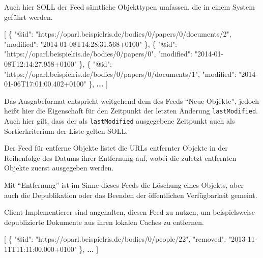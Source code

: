 \documentclass[,a4paper]{article}
\newenvironment{Shaded}{}{}
\newcommand{\DataTypeTok}[1]{\textcolor[rgb]{0.56,0.13,0.00}{{#1}}}
\newcommand{\StringTok}[1]{\textcolor[rgb]{0.25,0.44,0.63}{{#1}}}
\newcommand{\OtherTok}[1]{\textcolor[rgb]{0.00,0.44,0.13}{{#1}}}
\newcommand{\FunctionTok}[1]{\textcolor[rgb]{0.02,0.16,0.49}{{#1}}}
\newcommand{\ErrorTok}[1]{\textcolor[rgb]{1.00,0.00,0.00}{\textbf{{#1}}}}
\begin{document}
Auch hier SOLL der Feed sämtliche Objekttypen umfassen, die in einem
System geführt werden.

\begin{Shaded}
\begin{Highlighting}[]
\OtherTok{[}
    \FunctionTok{\{}
        \DataTypeTok{"@id"}\FunctionTok{:} \StringTok{"https://oparl.beispielris.de/bodies/0/papers/0/documents/2"}\FunctionTok{,}
        \DataTypeTok{"modified"}\FunctionTok{:} \StringTok{"2014-01-08T14:28:31.568+0100"}
    \FunctionTok{\}}\OtherTok{,}
    \FunctionTok{\{}
        \DataTypeTok{"@id"}\FunctionTok{:} \StringTok{"https://oparl.beispielris.de/bodies/0/papers/0"}\FunctionTok{,}
        \DataTypeTok{"modified"}\FunctionTok{:} \StringTok{"2014-01-08T12:14:27.958+0100"}
    \FunctionTok{\}}\OtherTok{,}
    \FunctionTok{\{}
        \DataTypeTok{"@id"}\FunctionTok{:} \StringTok{"https://oparl.beispielris.de/bodies/0/papers/0/documents/1"}\FunctionTok{,}
        \DataTypeTok{"modified"}\FunctionTok{:} \StringTok{"2014-01-06T17:01:00.402+0100"}
    \FunctionTok{\}}\OtherTok{,}
    \ErrorTok{...}
\OtherTok{]}
\end{Highlighting}
\end{Shaded}

Das Ausgabeformat entspricht weitgehend dem des Feeds ``Neue Objekte'',
jedoch heißt hier die Eigenschaft für den Zeitpunkt der letzten Änderung
\texttt{lastModified}. Auch hier gilt, dass der als
\texttt{lastModified} ausgegebene Zeitpunkt auch als Sortierkriterium
der Liste gelten SOLL.


Der Feed für entferne Objekte listet die URLs entfernter Objekte in der
Reihenfolge des Datums ihrer Entfernung auf, wobei die zuletzt
entfernten Objekte zuerst ausgegeben werden.

Mit ``Entfernung'' ist im Sinne dieses Feeds die Löschung eines Objekts,
aber auch die Depublikation oder das Beenden der öffentlichen
Verfügbarkeit gemeint.

Client-Implementierer sind angehalten, diesen Feed zu nutzen, um
beispielsweise depublizierte Dokumente aus ihren lokalen Caches zu
entfernen.

\begin{Shaded}
\begin{Highlighting}[]
\OtherTok{[}
    \FunctionTok{\{}
        \DataTypeTok{"@id"}\FunctionTok{:} \StringTok{"https://oparl.beispielris.de/bodies/0/people/22"}\FunctionTok{,}
        \DataTypeTok{"removed"}\FunctionTok{:} \StringTok{"2013-11-11T11:11:00.000+0100"}
    \FunctionTok{\}}\OtherTok{,}
    \ErrorTok{...}
\OtherTok{]}
\end{Highlighting}
\end{Shaded}
\end{document}
